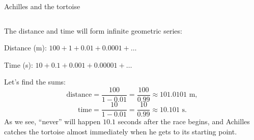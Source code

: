 \documentclass[9pt,aspectratio=169]{beamer}
\begin{document}
\begin{frame}{Achilles and the tortoise}
\begin{columns}[T]
\begin{column}{0.5\textwidth}
      The distance and time will form infinite geometric series:
      
      Distance (m): $100 + 1 + 0.01 + 0.0001 + \ldots$
      
      Time (s): $10 + 0.1 + 0.001 + 0.00001 + \ldots$
      
      Let’s find the sums:
      \[ \text{distance} = \frac{100}{1 - 0.01} = \frac{100}{0.99} \approx 101.0101 \text{ m}, \]\vspace*{-0.3em}
      \[ \text{time} = \frac{10}{1 - 0.01} = \frac{10}{0.99} \approx 10.101 \text{ s}. \]
      As we see, “never” will happen $10.1$ seconds after the race begins, and Achilles catches the tortoise almost immediately when he gets to its starting point.
    \end{column}
  \end{columns}
\end{frame}
\end{document}
